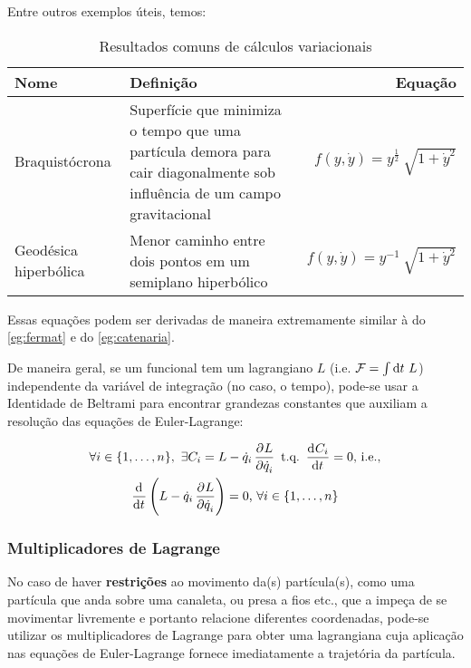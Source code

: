 Entre outros exemplos úteis, temos:

\begin{table}[H]
    \centering
    \begin{tabularx}{\textwidth}{lXr}
        \toprule
        Nome & Definição & Equação \\
        \midrule
        Braquistócrona & %
            Superfície que minimiza o tempo que uma partícula demora para %
            cair diagonalmente sob influência de um campo gravitacional & %
            $f(y, \dot y) = y^{\frac{1}{2}}~\sqrt{1 + {\dot y}^2}$ \\
        Geodésica hiperbólica & %
            Menor caminho entre dois pontos em um semiplano hiperbólico & %
            $f(y, \dot y) = y^{-1}~\sqrt{1 + {\dot y}^2}$ \\
        \bottomrule
    \end{tabularx}
    \caption{Resultados comuns de cálculos variacionais}
    \label{tab:varcalc_eg}
\end{table}

Essas equações podem ser derivadas de maneira extremamente similar à do
\autoref{eg:fermat} e do \autoref{eg:catenaria}.

De maneira geral, se um funcional tem um lagrangiano $L$ (i.e. $\mathcal{F}=\int
\dif t~L$) independente da variável de integração (no caso, o tempo), pode-se
usar a Identidade de Beltrami para encontrar grandezas constantes que auxiliam
a resolução das equações de Euler-Lagrange:

\begin{namedeq}
    \begin{gather*}
        \forall i \in \{1, \ldots, n\},~\exists C_i = L - \dot q_i
        \dpd{L}{\dot q_i}~\text{t.q.}~\dod{C_i}{t} = 0\text{, i.e.,} \\
        \dod{}{t} \del{L - \dot q_i \dpd{L}{\dot q_i}} = 0\text{,}~\forall i \in
            \{1, \ldots, n\}
        \label{eq:beltrami}
    \end{gather*}
\end{namedeq}

\subsubsection{Multiplicadores de Lagrange}
\label{sssec:lagrange_multipliers}

No caso de haver \textbf{restrições} ao movimento da(s) partícula(s), como uma
partícula que anda sobre uma canaleta, ou presa a fios etc., que a impeça de se
movimentar livremente e portanto relacione diferentes coordenadas, pode-se
utilizar os multiplicadores de Lagrange para obter uma lagrangiana cuja
aplicação nas equações de Euler-Lagrange fornece imediatamente a trajetória da
partícula.

